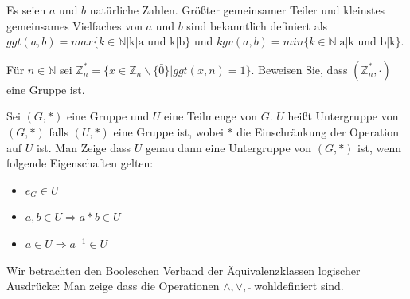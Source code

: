 \documentclass[10pt, a4paper]{exam}
\begin{document}
\begin{questions}

    \question Es seien $a$ und $b$ natürliche Zahlen. Größter gemeinsamer Teiler und kleinstes gemeinsames Vielfaches von $a$ und $b$ sind bekanntlich definiert als $ggt(a,b) = max\{k\in\mathbb{N} | \text{k|a und k|b}\}$ und $kgv(a,b)=min\{k\in\mathbb{N} | \text{a|k und b|k}\}$.

    \question Für $n\in\mathbb{N}$ sei $\mathbb{Z}_n^{\ast}=\{x\in\mathbb{Z}_n\backslash\{\bar{0}\}| ggt(x,n) = 1\}$. Beweisen Sie, dass $(\mathbb{Z}_n^{\ast},\cdot )$ eine Gruppe ist.

    \question Sei $(G,\ast)$ eine Gruppe und $U$ eine Teilmenge von $G$. $U$ heißt Untergruppe von $(G,\ast)$ falls $(U,\ast)$ eine Gruppe ist, wobei $\ast$ die Einschränkung der Operation auf $U$ ist. Man Zeige dass $U$ genau dann eine Untergruppe von $(G,\ast)$ ist, wenn folgende Eigenschaften gelten:
    \begin{itemize}
        \item $e_G\in U$
        \item $a,b\in U \Rightarrow a \ast b \in U$
        \item $a\in U\Rightarrow a^{-1}\in U$
    \end{itemize}

    \question Wir betrachten den Booleschen Verband der Äquivalenzklassen logischer Ausdrücke: Man zeige dass die Operationen $\wedge, \vee,\bar{}$ wohldefiniert sind.


\end{questions}
\end{document}

